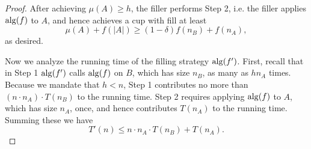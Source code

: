 \begin{proof}
  After achieving $\mu(A) \ge h$, the filler performs Step 2,
  i.e. the filler applies $\operatorname{\text{\textup{alg}}}(f)$ to $A$, and hence achieves a
  cup with fill at least $$\mu(A) + f(|A|) \ge (1-\delta)f(n_B) +
  f(n_A),$$ as desired.

  Now we analyze the running time of the filling strategy
  $\operatorname{\text{\textup{alg}}}(f')$. First, recall that in Step 1 $\operatorname{\text{\textup{alg}}}(f')$ calls
  $\operatorname{\text{\textup{alg}}}(f)$ on $B$, which has size $n_B$, as many as $h n_A$ times.
  Because we mandate that $h < n$, Step 1 contributes no more
  than $(n\cdot n_A) \cdot T(n_B)$ to the running time.
  Step 2 requires applying $\operatorname{\text{\textup{alg}}}(f)$ to $A$, which has size
  $n_A$, once, and hence
  contributes $T(n_A)$ to the running time. Summing these we have
  $$T'(n) \le n \cdot n_A \cdot T(n_B) + T(n_A).$$

\end{proof}


